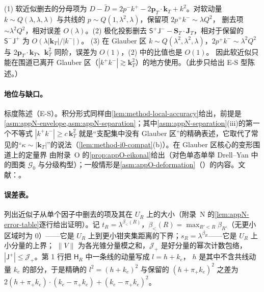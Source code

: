 \begin{proofsketch}
(1) 软近似删去的分母项为 $D-\tilde D=2p^-k^+-2\mathbf p_T\cdot\mathbf k_T+k^2$。对软动量 $k\sim Q(\lambda,\lambda,\lambda)$ 与共线的 $p\sim Q(1,\lambda^2,\lambda)$，保留项 $2p^+k^-\sim\lambda Q^2$，
删去项 $\sim\lambda^2Q^2$，相对误差 $O(\lambda)$。(2) 极化投影删去 $\mathsf S^+\mathsf J^--\mathbf S_T\cdot\mathbf J_T$，相对于保留的 $\mathsf S^-\mathsf J^+$ 为 $O(\lambda|\mathbf k_T|/|k^-|)$。%
(3) 在 Glauber 区 $k\sim Q(\lambda^2,\lambda^2,\lambda)$，$2p^+k^-\sim\lambda^2Q^2$ 与 $2\mathbf p_T\cdot\mathbf k_T$、$\mathbf k_T^2$ 同阶，误差为 $O(1)$，(2) 中的比值也是 $O(1)$。
因此软近似只能在围道已离开 Glauber 区（$|k^+k^-|\gtrsim\mathbf k_T^2$）的地方使用。（此步只给出 E-S 型陈述。）
\end{proofsketch}

\paragraph{地位与缺口。}标度陈述（E-S）。积分形式同样由\cref{lem:method-local-accuracy}给出，前提是\cref{asm:appN-envelope,asm:appN-separation}；其中\cref{asm:appN-separation}(iii)的第一个不等式 $|k^+k^-|\ge c\,\mathbf k_T^2$
就是“支配集中没有 Glauber 区”的精确表述，它取代了常见的“$\kappa\sim|\mathbf k_T|$”的说法（\cref{lem:method-i0-compat}(b)）。在 Glauber 区核心的变形围道上的定量界
由附录~O 的\cref{prop:appO-eikonal}给出（对色单态单举 Drell--Yan 中的图类 $\mathcal G_0$ 与分级构型）；一般情形是\cref{asm:appO-deformation}（\tagA）的内容。文献：\cite[第~10~章]{Collins2011}。

\paragraph{误差表。}列出近似子从单个因子中删去的项及其在 $U_R$ 上的大小（附录~N 的\cref{lem:appN-error-table}逐行给出证明）。记
$t_R=\lambda^{\beta_<(R)}$，$\beta_<(R)=\max_{R'<R}\beta_{R'}$（无更小区域时为 $0$）——它是 $U_R$ 上到更小钳夹集距离的下界；$s_R=\lambda^{\beta_R}$——它是 $U_R$ 上小分量的上界；
$\|V\|$ 为各光锥分量模之和，$\mathcal J_+$ 是好分量的幂次计数包络，$|\mathsf J^+|\le\mathcal J_+$。第 1 行把 $\mathsf H_R$ 中一条线的动量写成 $l=h+k_e$，
$h$ 是其中不含共线动量 $k_e$ 的部分，于是精确的 $l^2=(h+k_e)^2$ 与保留的 $(h+\pi_+k_e)^2$ 之差为 $2(h+\pi_+k_e)\cdot(k_e-\pi_+k_e)+(k_e-\pi_+k_e)^2$。

